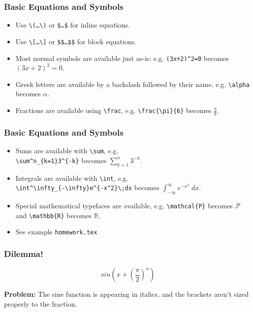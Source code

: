 \documentclass{beamer}
\begin{document}
\begin{frame}
	\frametitle{Basic Equations and Symbols}
	\begin{itemize}
		\item Use \texttt{\textbackslash{}(\dots\textbackslash{})} or \texttt{\$\dots\$} for inline equations.
		\item Use \texttt{\textbackslash{}[\dots\textbackslash{}]} or \texttt{\$\$\dots\$\$} for block equations.
		\item Most normal symbols are available just as-is: e.g. \texttt{(3x+2)\^{}2=0} becomes $(3x+2)^2=0$.
		\item Greek letters are available by a backslash followed by their name, e.g. \texttt{\textbackslash{}alpha} becomes $\alpha$.
		\item Fractions are available using \texttt{\textbackslash{}frac}, e.g. \texttt{\textbackslash{}frac\{\textbackslash{}pi\}\{6\}} becomes $\frac{\pi}{6}$.
	\end{itemize}
\end{frame}

\begin{frame}
	\frametitle{Basic Equations and Symbols}
	\begin{itemize}
		\item Sums are available with \texttt{\textbackslash{}sum}, e.g.\\\texttt{\textbackslash{}sum\^{}n\_\{k=1\}3\^{}\{-k\}} becomes $\sum^n_{k=1}3^{-k}$.
		\item Integrals are available with \texttt{\textbackslash{}int}, e.g.\\\texttt{\textbackslash{}int\^{}\textbackslash{}infty\_\{-\textbackslash{}infty\}e\^{}\{-x\^{}2\}\textbackslash{};dx} becomes $\int^\infty_{-\infty}e^{-x^2}\;dx$.
		\item Special mathematical typefaces are available, e.g. \texttt{\textbackslash{}mathcal\{P\}} becomes $\mathcal{P}$ and \texttt{\textbackslash{}mathbb\{R\}} becomes $\mathbb{R}$.
		\item See example \texttt{homework.tex}
	\end{itemize}
\end{frame}

\begin{frame}
	\frametitle{Dilemma!}
		\begin{center}
			
			\[
				sin(x+(\frac{\pi}{2})^n)
			\]
		\end{center}

		\textbf{Problem:} The sine function is appearing in italics, and the brackets aren't sized properly to the fraction.
\end{frame}
\end{document}
